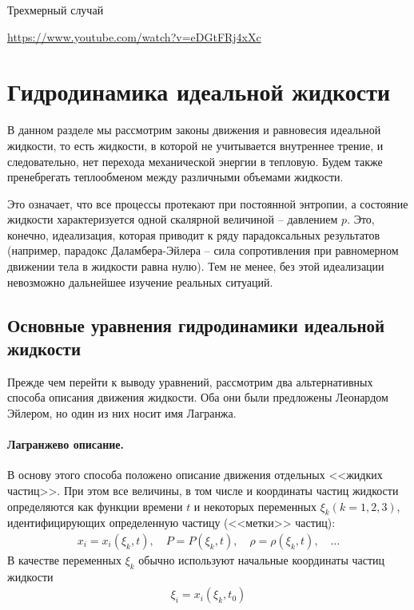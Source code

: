Трехмерный случай

\url{https://www.youtube.com/watch?v=eDGtFRj4xXc}


\newpage
\section{Гидродинамика идеальной жидкости}

В  данном разделе мы рассмотрим законы движения и равновесия идеальной жидкости, то есть жидкости, в которой не учитывается внутреннее трение, и следовательно, нет перехода механической энергии в тепловую. Будем также пренебрегать теплообменом между  различными объемами жидкости.

Это означает, что все процессы протекают при постоянной энтропии, а состояние жидкости характеризуется одной скалярной величиной --  давлением $p$. Это, конечно, идеализация, которая приводит к ряду парадоксальных результатов (например, парадокс  Даламбера-Эйлера --  сила сопротивления при равномерном движении тела в жидкости равна нулю). Тем не менее, без этой идеализации невозможно дальнейшее изучение реальных ситуаций.

\subsection{Основные уравнения гидродинамики идеальной жидкости}
Прежде чем перейти к выводу уравнений, рассмотрим два альтернативных способа описания движения жидкости. Оба они были предложены Леонардом Эйлером, но один из них носит имя Лагранжа.

\paragraph{Лагранжево описание.} В основу этого способа положено описание движения отдельных <<жидких частиц>>. При этом все величины, в том числе и  координаты частиц жидкости определяются как функции времени $t$  и некоторых переменных $\xi_k (k=1,2,3)$, идентифицирующих определенную частицу (<<метки>> частиц):
\begin{align*}
	x_i =x_i(\xi_k,t), \quad
	P =P(\xi_k,t), \quad
	\rho = \rho(\xi_k,t), \quad \ldots 
\end{align*}
В качестве переменных $\xi_k$ обычно используют начальные координаты частиц жидкости
\begin{align*}
	\xi_i = x_i(\xi_k, t_0)
\end{align*}

